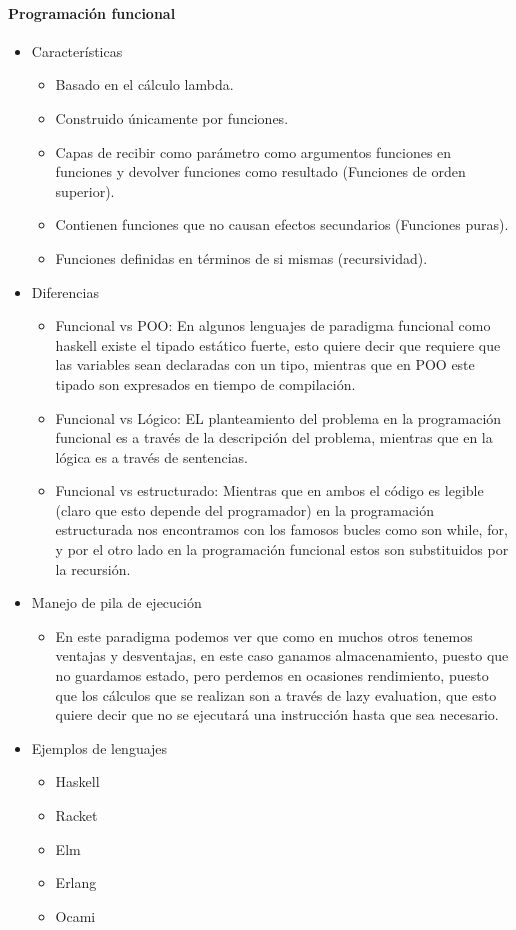 \documentclass[10pt]{article}
\begin{document}
\paragraph{\normalsize Programación funcional}
\begin{itemize}
  \item Características
    \begin{itemize}
      \item Basado en el cálculo lambda.
      \item Construido únicamente por funciones.
      \item Capas de recibir como parámetro como argumentos funciones en funciones y devolver funciones como resultado (Funciones de orden superior).
      \item Contienen funciones que no causan efectos secundarios (Funciones puras).
      \item Funciones definidas en términos de si mismas (recursividad).
    \end{itemize}
  \item Diferencias
    \begin{itemize}
      \item Funcional vs POO: En algunos lenguajes de paradigma funcional como haskell existe el tipado estático fuerte, esto quiere decir que requiere que las variables sean declaradas con un tipo, mientras que en POO este tipado son expresados en tiempo de compilación.
      \item Funcional vs Lógico: EL planteamiento del problema en la programación funcional es a través de la descripción del problema, mientras que en la lógica es a través de sentencias.
      \item Funcional vs estructurado: Mientras que en  ambos el código es legible (claro que esto depende del programador) en la programación estructurada nos encontramos con los famosos bucles como son while, for, y por el otro lado en la programación funcional estos son substituidos por la recursión.
    \end{itemize}
  \item Manejo de pila de ejecución
    \begin{itemize}
      \item En este paradigma podemos ver que como en muchos otros tenemos ventajas y desventajas, en este caso ganamos almacenamiento, puesto que no guardamos estado, pero perdemos en ocasiones rendimiento, puesto que los cálculos que se realizan son a través de lazy evaluation, que esto quiere decir que no se ejecutará una instrucción hasta que sea necesario.
    \end{itemize}
  \item Ejemplos de lenguajes
    \begin{itemize}
      \item Haskell
      \item Racket
      \item Elm
      \item Erlang
      \item Ocami
    \end{itemize}
\end{itemize}
\end{document}
